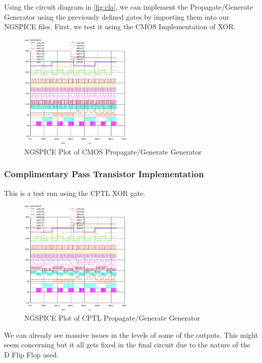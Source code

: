 \documentclass[conference]{IEEEtran}
\begin{document}
Using the circuit diagram in \ref{fig:cla}, we can implement the Propagate/Generate Generator using the previously defined gates by importing them into our NGSPICE files. First, we test it using the CMOS Implementation of XOR.

\begin{figure}[H]
    \centering
    \includegraphics[width=0.48\textwidth]{images/pg_gen_cmos_tran.eps}
    \caption{NGSPICE Plot of CMOS Propagate/Generate Generator}
\end{figure}

\subsubsection{Complimentary Pass Transistor Implementation}

This is a test run using the CPTL XOR gate.

\begin{figure}[H]
    \centering
    \includegraphics[width=0.48\textwidth]{images/pg_gen_optimized_tran.eps}
    \caption{NGSPICE Plot of CPTL Propagate/Generate Generator}
\end{figure}

We can already see massive issues in the levels of some of the outputs. This might seem concerning but it all gets fixed in the final circuit due to the nature of the D Flip Flop used.
\end{document}
